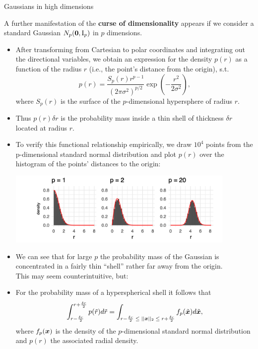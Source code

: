 \begin{vbframe}{Gaussians in high dimensions}

A further manifestation of the \textbf{curse of dimensionality} appears if we consider a standard Gaussian $N_p(\bm{0}, \mathrm{I}_p)$ in $p$ dimensions.

\begin{itemize}
    \item After transforming from Cartesian to polar coordinates and integrating out the directional variables, we obtain an expression for the density $p(r)$ as a function of the radius $r$ (i.e., the point's distance from the origin), s.t.
    $$ p(r) = \frac{S_p(r)r^{p-1}}{(2 \pi \sigma^2)^{p/2}} \exp \left( -\frac{r^2}{2\sigma^2}\right),$$
    where $S_p(r)$ is the surface of the $p$-dimensional hypersphere of radius $r$.
    \item Thus $p(r) \delta r$ is the probability mass inside a thin shell of thickness $\delta r$ located at radius $r$. 
    
  
\framebreak 
\item To verify this functional relationship empirically, we draw $10^4$ points from the p-dimensional standard normal distribution and plot $p(r)$ over the histogram of the points' distances to the origin:

\begin{center}
\includegraphics[width = 11cm ]{figure_man/histograms.png}
\end{center}

\item We can see that for large $p$ the probability mass of the Gaussian is concentrated in a fairly thin \enquote{shell} rather far away from the origin. \\
This may seem counterintuitive, but:

\framebreak

  \item For the probability mass of a hyperspherical shell it follows that
    $$\int^{r + \frac{\delta r}{2}}_{r - \frac{\delta r}{2}}p(\tilde{r})d\tilde{r} = \int_{r - \frac{\delta r}{2} \; \leq \; ||\bm{x}||_2 \; \leq \; r + \frac{\delta r}{2}} f_p(\tilde{\bm{x}}) d\tilde{\bm{x}},$$
    where $f_p(\bm{x})$ is the density of the $p$-dimensional standard normal distribution and $p(r)$ the associated radial density.


\end{itemize}
\end{vbframe}
